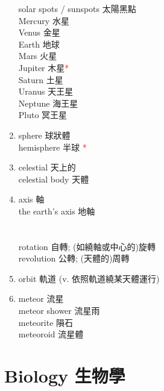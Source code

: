 \documentclass[twoside,b5paper]{book}
\begin{document}
\begin{enumerate}
      solar spots / sunspots 太陽黑點\\
      Mercury 水星\\
      Venus 金星\\
      Earth 地球\\
      Mars 火星\\
      Jupiter 木星\textcolor{red}{*}\\
      Saturn  土星\\
      Uranus  天王星\\
      Neptune  海王星\\
      Pluto  冥王星
    \item
      sphere  球狀體\\
      hemisphere  半球 \textcolor{red}{*}\\
    \item
      celestial  天上的\\
      celestial body 天體
    \item
      axis  軸\\
      the earth's axis 地軸\\
      \\
      \\
      rotation 自轉; (如繞軸或中心的)旋轉\\
      revolution 公轉; (天體的)周轉\\
    \item
      orbit  軌道 (v. 依照軌道繞某天體運行)
    \item
      meteor  流星\\
      meteor shower 流星雨\\
      meteorite  隕石\\
      meteoroid  流星體\\
  \end{enumerate}


  \chapter{Biology 生物學}
\end{document}

